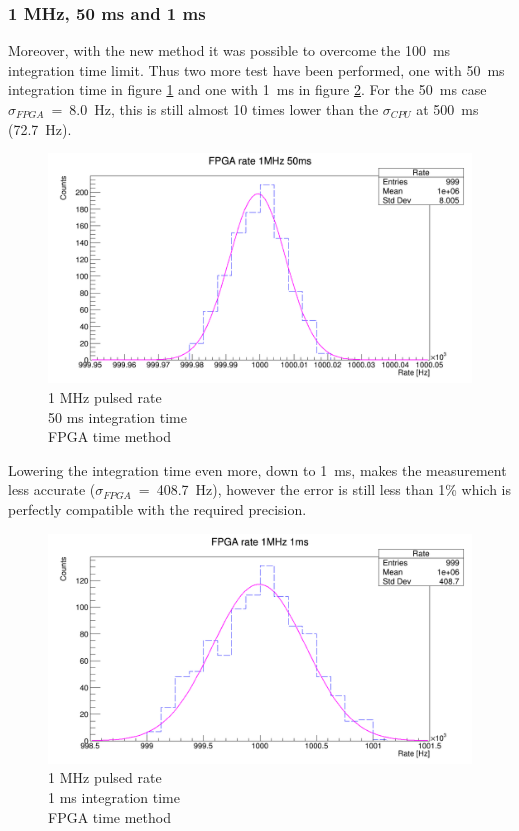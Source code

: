 \subsubsection{1 MHz, 50 ms and 1 ms}
\noindent Moreover, with the new method it was possible to overcome the 100~ms integration time limit. Thus two more test have been performed, one with 50~ms integration time in figure \ref{fig:FPGA-time-rate-1MHz-50ms} and one with 1~ms in figure \ref{fig:FPGA-time-rate-1MHz-1ms}.
For the 50~ms case $\sigma_{FPGA}$~=~8.0~Hz, this is still almost 10 times lower than the $\sigma_{CPU}$ at 500~ms (72.7~Hz).   
\begin{figure}[H]
	\centering
	\includegraphics[width=0.95\linewidth]{IMG/ch5/RateMeasures/FPGA-time-rate-1MHz-50ms}
	\caption{1 MHz pulsed rate\\50 ms integration time\\FPGA time method}
	\label{fig:FPGA-time-rate-1MHz-50ms}
\end{figure}
\noindent Lowering the integration time even more, down to 1~ms, makes the measurement less accurate ($\sigma_{FPGA}$~=~408.7~Hz), however the error is still less than 1\% which is perfectly compatible with the required precision.
\begin{figure}[H]
	\centering
	\includegraphics[width=0.95\linewidth]{IMG/ch5/RateMeasures/FPGA-time-rate-1MHz-1ms}
	\caption{1 MHz pulsed rate\\1 ms integration time\\FPGA time method}
	\label{fig:FPGA-time-rate-1MHz-1ms}
\end{figure}











